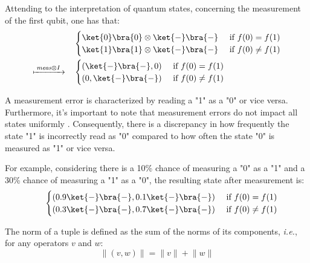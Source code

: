 Attending to the interpretation of quantum states, concerning the measurement of the first qubit, one has that:
\begin{equation}
\begin{split}
  \quad &
  \begin{cases}
    \ket{0} \bra{0} \otimes \ket{-} \bra{-}  &\text{ if }   f(0)= f(1) \\
    \ket{1} \bra{1} \otimes \ket{-} \bra{-} &\text{ if }   f(0) \neq f(1)
  \end{cases} \\
  \xmapsto{ \hspace{2pt} \textit{meas} \otimes I \hspace{2pt}} \quad &
  \begin{cases}
   (\ket{-} \bra{-},0)  &\text{ if }   f(0)= f(1) \\
   (0,\ket{-} \bra{-}) &\text{ if }   f(0) \neq f(1) 
  \end{cases} \\
\end {split}
\end{equation} 


A measurement error is characterized by reading a "1" as a "0" or vice versa. Furthermore, it's important to note that measurement errors do not impact all states uniformly \cite{tannu2019mitigating}. Consequently, there is a discrepancy in how frequently the state "1" is incorrectly read as "0" compared to how often the state "0" is measured as "1" or vice versa.

For example, considering there is a 10\% chance of measuring a "0" as a "1" and a 30\% chance of measuring a "1" as a "0", the resulting state after measurement is:
\begin{equation}
\begin{split}
  \quad &
  \begin{cases}
   (0.9\ket{-} \bra{-},0.1\ket{-} \bra{-})  &\text{ if }   f(0)= f(1) \\
   (0.3\ket{-} \bra{-}, 0.7\ket{-} \bra{-}) &\text{ if }   f(0) \neq f(1) 
  \end{cases} \\
\end {split}
\end{equation}

The norm of a tuple is defined as the sum of the norms of its components, \textit{i.e.}, for any operators $v$ and $w$:
\begin{equation} \label{eq:norm_tuple}
  \lVert (v,w) \rVert = \lVert v \rVert + \lVert w \rVert
\end{equation}

